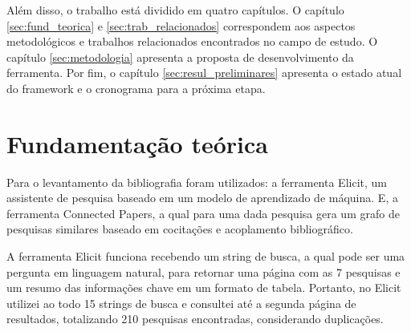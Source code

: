 \documentclass[12pt]{tcc}
\begin{document}
Além disso, o trabalho está dividido em quatro capítulos.
O capítulo \ref{sec:fund_teorica} e \ref{sec:trab_relacionados} correspondem aos aspectos metodológicos e trabalhos relacionados encontrados no campo de estudo.
O capítulo \ref{sec:metodologia} apresenta a proposta de desenvolvimento da ferramenta.
Por fim, o capítulo \ref{sec:resul_preliminares} apresenta o estado atual do framework e o cronograma para a próxima etapa.


\chapter{Fundamentação teórica}
\label{sec:background}
	\label{sec:fund_teorica}

Para o levantamento da bibliografia foram utilizados: 
a ferramenta Elicit, um assistente de pesquisa baseado em um modelo  de aprendizado de máquina.
E, a ferramenta Connected Papers, a qual para uma dada pesquisa gera um grafo de pesquisas similares baseado em cocitações e acoplamento bibliográfico.

A ferramenta Elicit funciona recebendo um string de busca, a qual pode ser uma pergunta em linguagem natural, para retornar uma página com as 7 pesquisas e um resumo das informações chave em um formato de tabela.
Portanto, no Elicit utilizei ao todo 15 strings de busca e consultei até a segunda página de resultados, totalizando 210 pesquisas encontradas, considerando duplicações.
\end{document}

